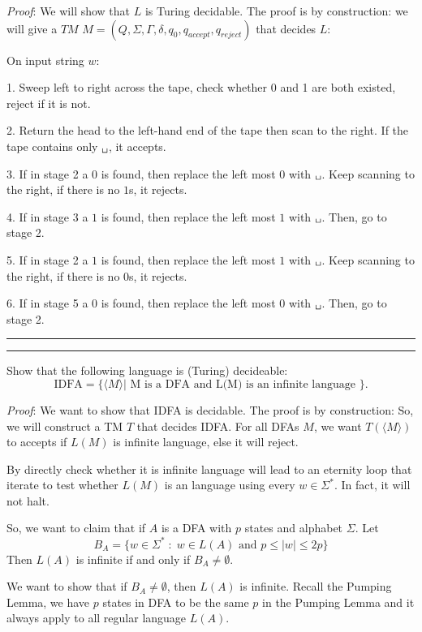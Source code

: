 \documentclass[a4paper, 11pt]{article}
\newcommand{\question}[2] {\vspace{.25in} \hrule\vspace{0.5em}
	\noindent{\bf #1: #2} \vspace{0.5em}
	\hrule \vspace{.10in}}
\begin{document}
	{\em Proof}: %
	We will show that $L$ is Turing decidable. The proof is by construction: we will give a $TM$ $M = (Q, \Sigma, \Gamma, \delta, q_0 , q_{accept} , q_{reject})$ that decides $L$:
	
	On input string $w$:
	
	1. Sweep left to right across the tape, check whether 0 and 1 are both existed, reject if it is not.
	
	2. Return the head to the left-hand end of the tape then scan to the right. If the tape contains only $\texttt{\char32}$, it accepts.
	
	3. If in stage 2 a $0$ is found, then replace the left most $0$ with $\texttt{\char32}$. Keep scanning to the right, if there is no $1$s, it rejects.
	
	4. If in stage 3 a $1$ is found, then replace the left most $1$ with $\texttt{\char32}$. Then, go to stage 2.
	
	5. If in stage 2 a $1$ is found, then replace the left most $1$ with $\texttt{\char32}$. Keep scanning to the right, if there is no $0$s, it rejects.
	
	6. If in stage 5 a $0$ is found, then replace the left most $0$ with $\texttt{\char32}$. Then, go to stage 2.
	
	\question{5}{Infinite DFA}
	
	Show that the following language is (Turing) decideable:
	$$ \text{IDFA} = \{\langle M \rangle| \text{ M is a DFA and L(M) is an infinite language  } \}.$$
	
	{\em Proof}: We want to show that IDFA is decidable. The proof is by construction: So, we will construct a TM $T$ that decides IDFA. For all DFAs $M$, we want $T(\langle M \rangle)$ to accepts if $L(M)$ is infinite language, else it will reject. 
	
	By directly check whether it is infinite language will lead to an eternity loop that iterate to test whether $L(M)$ is an language using every $w \in \Sigma^*$. In fact, it will not halt.
	
	So, we want to claim that if $A$ is a DFA with $p$ states and alphabet $\Sigma$. Let
	$$ B_A = \{ w\in \Sigma^* \; : \; w \in L(A) \text{ and } p \leq |w| \leq 2p\}$$
	Then $L(A)$ is infinite if and only if $B_A \neq \emptyset$.
	
	We want to show that if $B_A \neq \emptyset$, then $L(A)$ is infinite. Recall the Pumping Lemma, we have $p$ states in DFA to be the same $p$ in the Pumping Lemma and it always apply to all regular language $L(A)$. 
	
\end{document}
